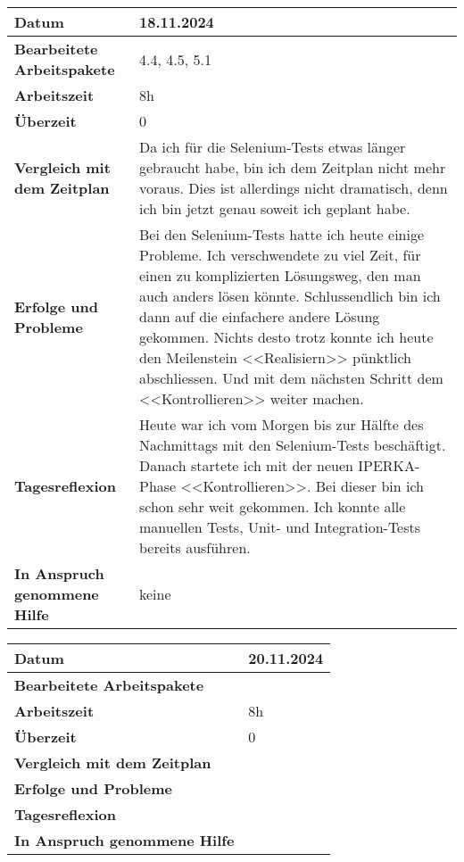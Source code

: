 \begin{longtable}{p{}|p{}}
	\hline
	\textbf{Datum}                       & 18.11.2024 \\
	\hline
	\textbf{Bearbeitete Arbeitspakete}   & 4.4, 4.5, 5.1\\
	\hline
	\textbf{Arbeitszeit}                 & 8h \\
	\hline
	\textbf{Überzeit}                    & 0 \\
	\hline
	\textbf{Vergleich mit dem Zeitplan}  & Da ich für die Selenium-Tests etwas länger gebraucht habe, bin ich dem Zeitplan nicht mehr voraus. Dies ist allerdings nicht dramatisch, denn ich bin jetzt genau soweit ich geplant habe.\\
	\hline
	\textbf{Erfolge und Probleme}        & Bei den Selenium-Tests hatte ich heute einige Probleme. Ich verschwendete zu viel Zeit, für einen zu komplizierten Lösungsweg, den man auch anders lösen könnte. Schlussendlich bin ich dann auf die einfachere andere Lösung gekommen. Nichts desto trotz konnte ich heute den Meilenstein <<Realisiern>> pünktlich abschliessen. Und mit dem nächsten Schritt dem <<Kontrollieren>> weiter machen.
	\\
	\hline
	\textbf{Tagesreflexion}              &  Heute war ich vom Morgen bis zur Hälfte des Nachmittags mit den Selenium-Tests beschäftigt. Danach startete ich mit der neuen IPERKA-Phase <<Kontrollieren>>. Bei dieser bin ich schon sehr weit gekommen. Ich konnte alle manuellen Tests, Unit- und Integration-Tests bereits ausführen.
	\\
	\hline
	\textbf{In Anspruch genommene Hilfe} & keine \\
	\hline
\end{longtable}\label{tab:arbeitsprotokoll-tag8}
\newpage

\begin{longtable}{p{}|p{}}
	\hline
	\textbf{Datum}                       & 20.11.2024 \\
	\hline
	\textbf{Bearbeitete Arbeitspakete}   & \\
	\hline
	\textbf{Arbeitszeit}                 & 8h \\
	\hline
	\textbf{Überzeit}                    & 0 \\
	\hline
	\textbf{Vergleich mit dem Zeitplan}  & \\
	\hline
	\textbf{Erfolge und Probleme}        & 
	\\
	\hline
	\textbf{Tagesreflexion}              &
	\\
	\hline
	\textbf{In Anspruch genommene Hilfe} & \\
	\hline
\end{longtable}\label{tab:arbeitsprotokoll-tag9}
\newpage

